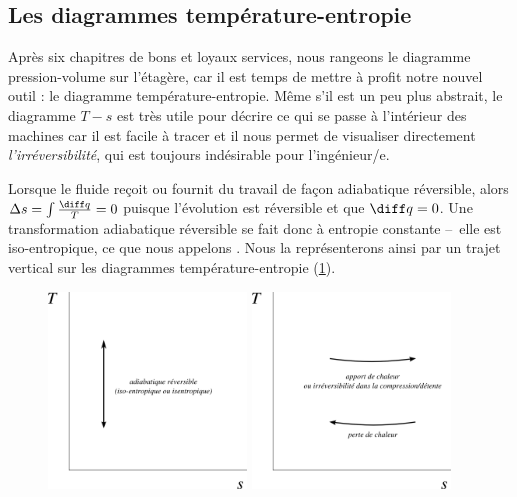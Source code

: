 	
	\subsection{Les diagrammes température-entropie}
	
		Après six chapitres de bons et loyaux services, nous rangeons le diagramme pression-volume sur l’étagère, car il est temps de mettre à profit notre nouvel outil : le diagramme température-entropie. Même s’il est un peu plus abstrait, le diagramme $T-s$ est très utile pour décrire ce qui se passe à l’intérieur des machines car il est facile à tracer et il nous permet de visualiser directement \emph{l’irréversibilité}, qui est toujours indésirable pour l’ingénieur/e. 

		Lorsque le fluide reçoit ou fournit du travail de façon adiabatique réversible, alors $\Delta s = \int \frac{\diff q}{T} = 0$ puisque l’évolution est réversible et que $\diff q = 0$. Une transformation adiabatique réversible se fait donc à entropie constante --\ elle est iso-entropique, ce que nous appelons . Nous la représenterons ainsi par un trajet vertical sur les diagrammes température-entropie (\cref{fig_ts_basics}).

		\begin{figure}
			\begin{center}
				\includegraphics[width=0.47\textwidth]{images/ts_basics_1.png}
				\includegraphics[width=0.47\textwidth]{images/ts_basics_2.png}
			\end{center}
			\label{fig_ts_basics}
		\end{figure}

